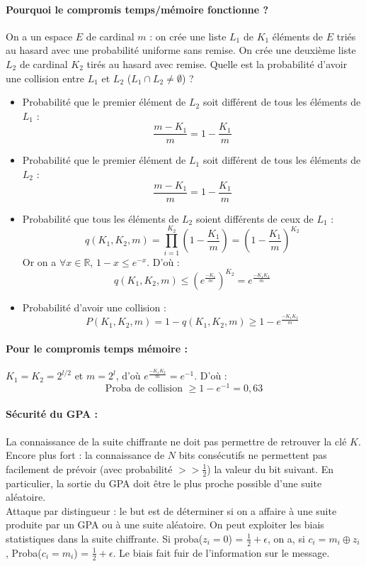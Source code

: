 \documentclass[12pt,a4paper]{report}
\begin{document}
\paragraph{Pourquoi le compromis temps/mémoire fonctionne ?\\}
On a un espace $E$ de cardinal $m$ : on crée une liste $L_1$ de $K_1$ éléments de $E$ triés au hasard avec une probabilité uniforme sans remise. On crée une deuxième liste $L_2$ de cardinal $K_2$ tirés au hasard avec remise. Quelle est la probabilité d'avoir une collision entre $L_1$ et $L_2$ ($L_1 \cap L_2 \neq \emptyset$) ?
\begin{itemize}
\item Probabilité que le premier élément de $L_2$ soit différent de tous les éléments de $L_1$ :
$$ \frac{m-K_1}{m}= 1 - \frac{K_1}{m} $$
\item Probabilité que le premier élément de $L_1$ soit différent de tous les éléments de $L_2$ :
$$ \frac{m-K_1}{m} = 1 - \frac{K_1}{m}$$
\item Probabilité que tous les éléments de $L_2$ soient différents de ceux de $L_1$ :
$$q(K_1,K_2,m) = \prod_{i=1}^{K_2} \left(1-\frac{K_1}{m}\right) = \left(1-\frac{K_1}{m}\right)^{K_2}$$
Or on a $\forall x \in \mathbb{R}$, $1-x \leqslant e^{-x} $. D'où :
$$ q(K_1,K_2,m) \leqslant \left(e^{\frac{-K_1}{m}}\right)^{K_2} = e^{\frac{-K_1K_2}{m}} $$
\item Probabilité d'avoir une collision :
$$ P(K_1,K_2,m) = 1-q(K_1,K_2,m) \geqslant 1-e^{\frac{-K_1K_2}{m}} $$
\end{itemize}
\paragraph{Pour le compromis temps mémoire :\\}
$K_1=K_2=2^{l/2}$ et $m=2^l$, d'où $e^{\frac{-K_1K_2}{m}}=e^{-1}$. D'où :
$$ \mbox{Proba de collision } \geqslant 1-e^{-1} = 0,63 $$
\paragraph{Sécurité du GPA :\\}
La connaissance de la suite chiffrante ne doit pas permettre de retrouver la clé $K$. Encore plus fort : la connaissance de $N$ bits consécutifs ne permettent pas facilement de prévoir (avec probabilité $>> \frac{1}{2}$) la valeur du bit suivant. En particulier, la sortie du GPA doit être le plus proche possible d'une suite aléatoire. \\
Attaque par distingueur : le but est de déterminer si on a affaire à une suite produite par un GPA ou à une suite aléatoire. On peut exploiter les biais statistiques dans la suite chiffrante. Si proba($z_i=0$) = $\frac{1}{2} + \epsilon$, on a, si $c_i=m_i \oplus z_i$, Proba($c_i = m_i$) =  $\frac{1}{2} + \epsilon$. Le biais fait fuir de l'information sur le message.
\end{document}
